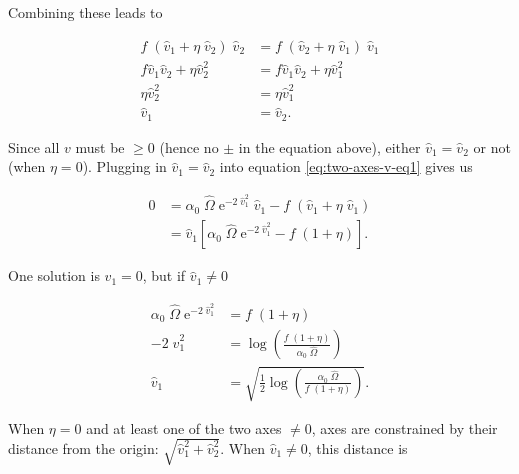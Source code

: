 \noindent Combining these leads to

\begin{equation*}
\begin{split}
    f \; ( \hat{v}_{1} + \eta \; \hat{v}_{2} ) \; \hat{v}_{2} &=
        f \; ( \hat{v}_{2} + \eta \; \hat{v}_{1} ) \; \hat{v}_{1} \\
    f \hat{v}_{1} \hat{v}_{2} + \eta \hat{v}_{2}^2 &=
        f \hat{v}_{1} \hat{v}_{2} + \eta \hat{v}_{1}^2 \\
    \eta \hat{v}_{2}^2 &= \eta \hat{v}_{1}^2 \\
    \hat{v}_{1} &= \hat{v}_{2}
    \textrm{.}
\end{split}
\end{equation*}

Since all $v$ must be $\ge 0$ (hence no $\pm$ in the equation above),
either $\hat{v}_{1} = \hat{v}_{2}$ or not (when $\eta = 0$).
Plugging in $\hat{v}_{1} = \hat{v}_{2}$ into equation \ref{eq:two-axes-v-eq1}
gives us

\begin{equation*}
\begin{split}
    0 &= \alpha_0 \; \hat{\Omega} \; \textrm{e}^{-2 \; \hat{v}_{1}^2 } \; \hat{v}_{1}
        - f \; ( \hat{v}_{1} + \eta \; \hat{v}_{1} ) \\
    &= \hat{v}_{1} \left[ \alpha_0 \; \hat{\Omega} \; \textrm{e}^{-2 \; \hat{v}_{1}^2 }
        - f \; ( 1 + \eta ) \right]
    \textrm{.}
\end{split}
\end{equation*}

\noindent One solution is $\hat{v}_{1} = 0$, but if $\hat{v}_{1} \ne 0$


\begin{equation}
\begin{split}
    \alpha_0 \; \hat{\Omega} \; \textrm{e}^{-2 \; \hat{v}_{1}^2 } &=
        f \; ( 1 + \eta ) \\
    -2 \; \hat{v}_{1}^2 &=
        \log \left( \frac{ f \; ( 1 + \eta ) }{ \alpha_0 \; \hat{\Omega} } \right) \\
    \hat{v}_{1} &= \sqrt{\frac{1}{2}
        \log \left( \frac{ \alpha_0 \; \hat{\Omega} }{ f \; ( 1 + \eta ) } \right) }
    \textrm{.}
\end{split}
\label{eq:two-axes-v-eq5}
\end{equation}



When $\eta = 0$ and at least one of the two axes $\ne 0$,
axes are constrained by their distance
from the origin: $\sqrt{\hat{v}_{1}^2 + \hat{v}_{2}^2}$.
When $\hat{v}_{1} \ne 0$, this distance is

